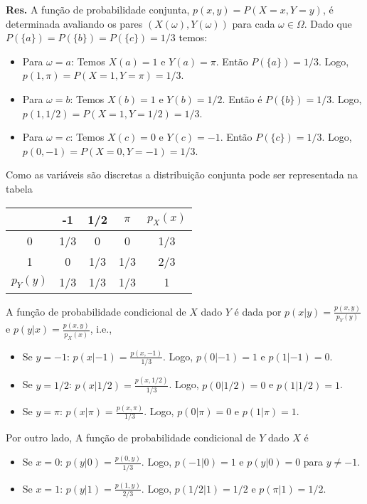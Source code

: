 {\small {\bf Res.}
A função de probabilidade conjunta, $p(x, y) = P(X=x, Y=y)$, é determinada avaliando os pares $(X(\omega), Y(\omega))$ para cada $\omega \in \Omega.$ Dado que $P(\{a\}) = P(\{b\}) = P(\{c\}) = 1/3$ temos: \begin{itemize}
	\item Para $\omega = a$: Temos $X(a) = 1$ e $Y(a) = \pi$. Então  $P(\{a\}) = 1/3$. Logo, $p(1, \pi) = P(X=1, Y=\pi) = 1/3$.
	
	\item Para $\omega = b$: Temos $X(b) = 1$ e $Y(b) = 1/2$. Então é $P(\{b\}) = 1/3$. Logo, $p(1, 1/2) = P(X=1, Y=1/2) = 1/3$.
	
	\item Para $\omega = c$: Temos $X(c) = 0$ e $Y(c) = -1$. Então $P(\{c\}) = 1/3$. Logo, $p(0, -1) = P(X=0, Y=-1) = 1/3$.
\end{itemize} Como as variáveis são discretas a distribuição conjunta pode ser representada na tabela \begin{center}
	\begin{tabular}{c|ccc|c}
		\toprule
		\diagbox[height=0.7cm]{$X$}{$Y$} & -1 & 1/2 & $\pi$ & $p_X(x)$ \\
		\midrule
		0 & 1/3 & 0 & 0 & 1/3 \\
		1 & 0 & 1/3 & 1/3 & 2/3 \\
		\midrule
		$p_Y(y)$ & 1/3 & 1/3 & 1/3 & 1 \\
		\bottomrule
	\end{tabular}
\end{center}
A função de probabilidade condicional de $X$ dado $Y$ é dada por $p(x|y) = \frac{p(x,y)}{p_Y(y)}$ e $p(y|x) = \frac{p(x,y)}{p_X(x)}$, i.e.,
\begin{itemize}
	\item Se $y=-1$: $p(x|-1) = \frac{p(x,-1)}{1/3}$. Logo, $p(0|-1)=1$ e $p(1|-1)=0$.
	\item Se $y=1/2$: $p(x|1/2) = \frac{p(x,1/2)}{1/3}$. Logo, $p(0|1/2)=0$ e $p(1|1/2)=1$.
	\item Se $y=\pi$: $p(x|\pi) = \frac{p(x,\pi)}{1/3}$. Logo, $p(0|\pi)=0$ e $p(1|\pi)=1$.
\end{itemize}Por outro lado, A função de probabilidade condicional de $Y$ dado $X$ é
\begin{itemize}
	\item Se $x=0$: $p(y|0) = \frac{p(0,y)}{1/3}$. Logo, $p(-1|0)=1$ e $p(y|0)=0$ para $y \neq -1$.
	\item Se $x=1$: $p(y|1) = \frac{p(1,y)}{2/3}$. Logo, $p(1/2|1)=1/2$ e $p(\pi|1)=1/2$.

\end{itemize}}
